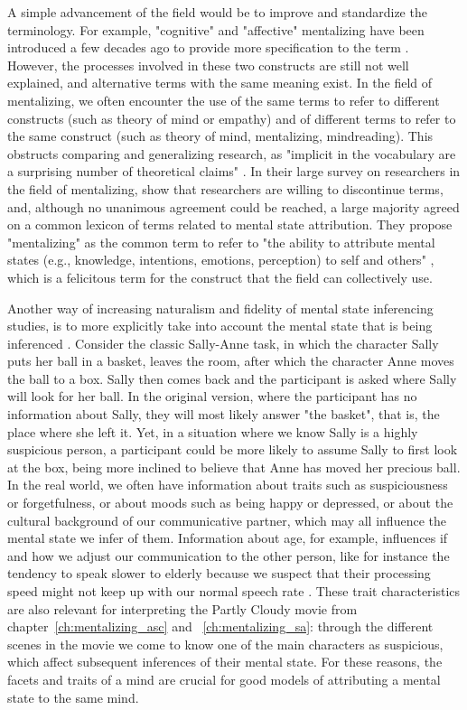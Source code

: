 A simple advancement of the field would be to improve and standardize the terminology. For example, "cognitive" and "affective" mentalizing have been introduced a few decades ago to provide more specification to the term \citep{brothers1992,shamay2009}. However, the processes involved in these two constructs are still not well explained, and alternative terms with the same meaning exist. In the field of mentalizing, we often encounter the use of the same terms to refer to different constructs (such as theory of mind or empathy) and of different terms to refer to the same construct (such as theory of mind, mentalizing, mindreading). This obstructs comparing and generalizing research, as "implicit in the vocabulary are a surprising number of theoretical claims" \citep[p. 14]{searle1992}. In their large survey on researchers in the field of mentalizing, \cite{quesque2024} show that researchers are willing to discontinue terms, and, although no unanimous agreement could be reached, a large majority agreed on a common lexicon of terms related to mental state attribution. They propose "mentalizing" as the common term to refer to "the ability to attribute mental states (e.g., knowledge, intentions, emotions, perception) to self and others" \citep[p. 2]{quesque2024}, which is a felicitous term for the construct that the field can collectively use. 

Another way of increasing naturalism and fidelity of mental state inferencing studies, is to more explicitly take into account the mental state that is being inferenced \citep{conway2019}. Consider the classic Sally-Anne task, in which the character Sally puts her ball in a basket, leaves the room, after which the character Anne moves the ball to a box. Sally then comes back and the participant is asked where Sally will look for her ball. In the original version, where the participant has no information about Sally, they will most likely answer "the basket", that is, the place where she left it. Yet, in a situation where we know Sally is a highly suspicious person, a participant could be more likely to assume Sally to first look at the box, being more inclined to believe that Anne has moved her precious ball. In the real world, we often have information about traits such as suspiciousness or forgetfulness, or about moods such as being happy or depressed, or about the cultural background of our communicative partner, which may all influence the mental state we infer of them. Information about age, for example, influences if and how we adjust our communication to the other person, like for instance the tendency to speak slower to elderly because we suspect that their processing speed might not keep up with our normal speech rate \citep{stolk2013neural,kemper1999}. These trait characteristics are also relevant for interpreting the Partly Cloudy movie from chapter~\ref{ch:mentalizing_asc} and ~\ref{ch:mentalizing_sa}: through the different scenes in the movie we come to know one of the main characters as suspicious, which affect subsequent inferences of their mental state. For these reasons, the facets and traits of a mind are crucial for good models of attributing a mental state to the same mind. 

